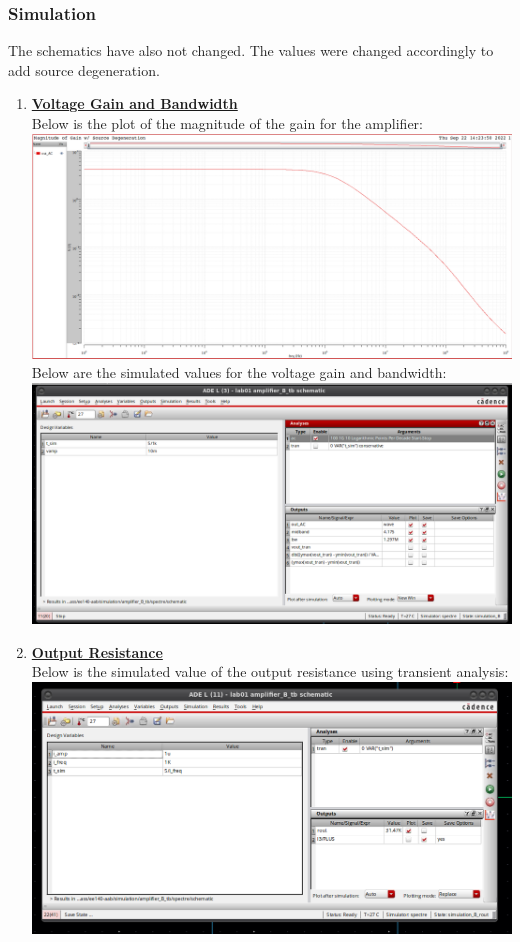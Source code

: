 \documentclass[12pt, fleqn]{article}
\begin{document}
\subsubsection{Simulation}
The schematics have also not changed.  The values were changed accordingly to add source degeneration.
\begin{enumerate}
    \item
    {
    \textbf{\underline{Voltage Gain and Bandwidth}}\\[0.25cm]
    Below is the plot of the magnitude of the gain for the amplifier:\\[0.1cm]
    \includegraphics[scale=0.35, center]{b_plot.png}\\[0.5cm]
    Below are the simulated values for the voltage gain and bandwidth:\\[0.1cm]
    \includegraphics[scale=0.55, center]{b_gbw.png}\\
    }
    \newpage
    \item
    {
    \textbf{\underline{Output Resistance}}\\[0.25cm]
    Below is the simulated value of the output resistance using transient analysis:\\[0.1cm]
    \includegraphics[scale=0.5, center]{b_rout.png}\\[0.5cm]
}
\end{enumerate}
\end{document}
